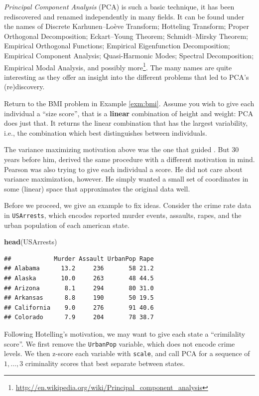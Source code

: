 \documentclass[]{book}
\newenvironment{Shaded}{\begin{snugshade}}{\end{snugshade}}
\newcommand{\KeywordTok}[1]{\textcolor[rgb]{0.13,0.29,0.53}{\textbf{#1}}}
\newcommand{\NormalTok}[1]{#1}
\theoremstyle{definition}
\theoremstyle{definition}
\theoremstyle{definition}
\theoremstyle{remark}
\begin{document}
\emph{Principal Component Analysis} (PCA) is such a basic technique, it
has been rediscovered and renamed independently in many fields. It can
be found under the names of Discrete Karhunen--Loève Transform;
Hotteling Transform; Proper Orthogonal Decomposition; Eckart--Young
Theorem; Schmidt--Mirsky Theorem; Empirical Orthogonal Functions;
Empirical Eigenfunction Decomposition; Empirical Component Analysis;
Quasi-Harmonic Modes; Spectral Decomposition; Empirical Modal Analysis,
and possibly more\footnote{\url{http://en.wikipedia.org/wiki/Principal_component_analysis}}.
The many names are quite interesting as they offer an insight into the
different problems that led to PCA's (re)discovery.

Return to the BMI problem in Example \ref{exm:bmi}. Assume you wish to
give each individual a ``size score'', that is a \textbf{linear}
combination of height and weight: PCA does just that. It returns the
linear combination that has the largest variability, i.e., the
combination which best distinguishes between individuals.

The variance maximizing motivation above was the one that guided
\citet{hotelling1933analysis}. But \(30\) years before him,
\citet{pearson1901liii} derived the same procedure with a different
motivation in mind. Pearson was also trying to give each individual a
score. He did not care about variance maximization, however. He simply
wanted a small set of coordinates in some (linear) space that
approximates the original data well.

Before we proceed, we give an example to fix ideas. Consider the crime
rate data in \texttt{USArrests}, which encodes reported murder events,
assaults, rapes, and the urban population of each american state.

\begin{Shaded}
\begin{Highlighting}[]
\KeywordTok{head}\NormalTok{(USArrests)}
\end{Highlighting}
\end{Shaded}

\begin{verbatim}
##            Murder Assault UrbanPop Rape
## Alabama      13.2     236       58 21.2
## Alaska       10.0     263       48 44.5
## Arizona       8.1     294       80 31.0
## Arkansas      8.8     190       50 19.5
## California    9.0     276       91 40.6
## Colorado      7.9     204       78 38.7
\end{verbatim}

Following Hotelling's motivation, we may want to give each state a
``crimilality score''. We first remove the \texttt{UrbanPop} variable,
which does not encode crime levels. We then z-score each variable with
\texttt{scale}, and call PCA for a sequence of \(1,\dots,3\) criminality
scores that best separate between states.
\end{document}
